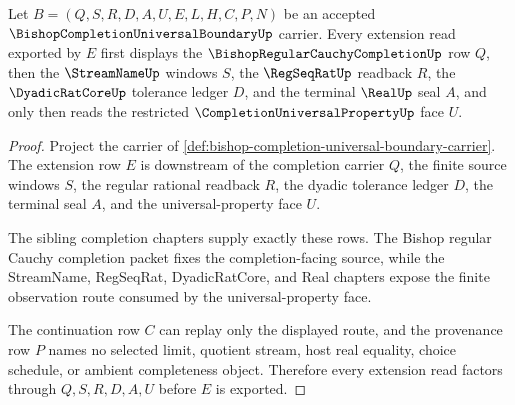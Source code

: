 \begin{theorem}
\label{thm:bishop-completion-universal-extension-route}
Let $B=(Q,S,R,D,A,U,E,L,H,C,P,N)$ be an accepted $\BishopCompletionUniversalBoundaryUp$ carrier. Every extension read exported by $E$ first displays the $\BishopRegularCauchyCompletionUp$ row $Q$, then the $\StreamNameUp$ windows $S$, the $\RegSeqRatUp$ readback $R$, the $\DyadicRatCoreUp$ tolerance ledger $D$, and the terminal $\RealUp$ seal $A$, and only then reads the restricted $\CompletionUniversalPropertyUp$ face $U$.
\end{theorem}
\begin{proof}
Project the carrier of \autoref{def:bishop-completion-universal-boundary-carrier}. The extension row $E$ is downstream of the completion carrier $Q$, the finite source windows $S$, the regular rational readback $R$, the dyadic tolerance ledger $D$, the terminal seal $A$, and the universal-property face $U$.

The sibling completion chapters supply exactly these rows. The Bishop regular Cauchy completion packet fixes the completion-facing source, while the StreamName, RegSeqRat, DyadicRatCore, and Real chapters expose the finite observation route consumed by the universal-property face.

The continuation row $C$ can replay only the displayed route, and the provenance row $P$ names no selected limit, quotient stream, host real equality, choice schedule, or ambient completeness object. Therefore every extension read factors through $Q,S,R,D,A,U$ before $E$ is exported.
\end{proof}

